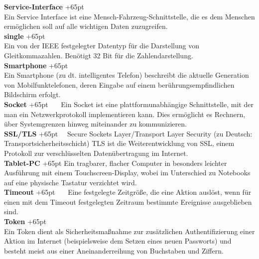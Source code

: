 \documentclass[fontsize = 12pt, paper = a4]{scrreprt}
\begin{document}
\textbf{Service-Interface}
\hangindent+65pt  \\
Ein Service Interface ist eine Mensch-Fahrzeug-Schnittstelle, die es dem Menschen ermöglichen soll auf alle wichtigen Daten zuzugreifen.\\

\textbf{single}
\hangindent+65pt  \\
Ein von der IEEE festgelegter Datentyp für die Darstellung von Gleitkommazahlen. Benötigt 32 Bit für die Zahlendarstellung.\\

\textbf{Smartphone}
\hangindent+65pt  \\
Ein Smartphone (zu dt. intelligentes Telefon) beschreibt die aktuelle Gene\-ration von Mobilfunktelefonen, deren Eingabe auf einem berührungsempfindlichen Bildschirm erfolgt.\\

\textbf{Socket}
\hangindent+65pt 
\ \ \ Ein Socket ist eine plattformunabhängige Schnittstelle, mit der man ein Netzwerkprotokoll implementieren kann. Dies ermöglicht es Rechnern, über Systemgrenzen hinweg miteinander zu kommunizieren.\\

\textbf{SSL/TLS}
\hangindent+65pt  
\ \ Secure Sockets Layer/Transport Layer Security (zu Deutsch: Transportsicherheitsschicht) TLS ist die Weiterentwicklung von SSL, einem Protokoll zur verschlüsselten Datenübertragung im Internet.\\

\textbf{Tablet-PC}
\hangindent+65pt  
Ein tragbarer, flacher Computer in besonders leichter Ausführung mit einem Touchscreen-Display, wobei im Unterschied zu Notebooks auf eine physische Tastatur verzichtet wird.\\

\textbf{Timeout}
\hangindent+65pt  
\ \ \ Eine festgelegte Zeitgröße, die eine Aktion auslöst, wenn für einen mit dem Timeout festgelegten Zeitraum bestimmte Ereignisse ausgeblieben sind.\\

\textbf{Token}
\hangindent+65pt  \\
Ein Token dient als Sicherheitsmaßnahme zur zusätzlichen Authentifizierung einer Aktion im Internet (beispielsweise dem Setzen eines neuen Passworts) und besteht meist aus einer Aneinanderreihung von Buchstaben und Ziffern.\\
\end{document}
